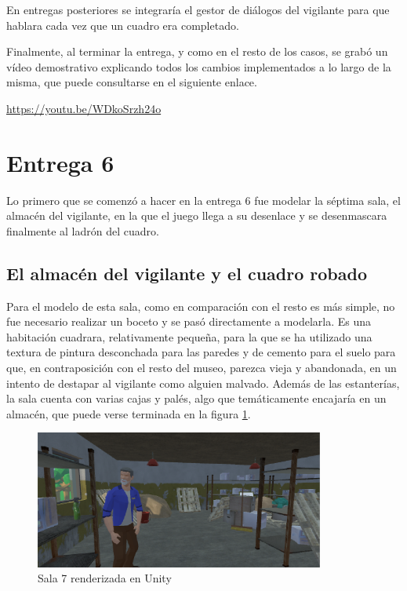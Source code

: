 En entregas posteriores se integraría el gestor de diálogos del vigilante para que hablara cada vez que un cuadro era completado.

Finalmente, al terminar la entrega, y como en el resto de los casos, se grabó un vídeo demostrativo explicando todos los cambios implementados a lo largo de la misma, que puede consultarse en el siguiente enlace.

\begin{center}
    \url{https://youtu.be/WDkoSrzh24o}
\end{center}



\section{Entrega 6}

Lo primero que se comenzó a hacer en la entrega 6 fue modelar la séptima sala, el almacén del vigilante, en la que el juego llega a su desenlace y se desenmascara finalmente al ladrón del cuadro.

\subsection{El almacén del vigilante y el cuadro robado}

Para el modelo de esta sala, como en comparación con el resto es más simple, no fue necesario realizar un boceto y se pasó directamente a modelarla. Es una habitación cuadrara, relativamente pequeña, para la que se ha utilizado una textura de pintura desconchada para las paredes y de cemento para el suelo para que, en contraposición con el resto del museo, parezca vieja y abandonada, en un intento de destapar al vigilante como alguien malvado. Además de las estanterías, la sala cuenta con varias cajas y palés, algo que temáticamente encajaría en un almacén, que puede verse terminada en la figura \ref{fig:unity-sala-7}.

\begin{figure}[!h]
\begin{center}
\includegraphics[width=0.85\textwidth]{imagenes/7/salas-unity/unity-sala-7.png}
\caption{Sala 7 renderizada en Unity}
\label{fig:unity-sala-7}
\end{center}
\vspace{-0.35cm}
\end{figure}


